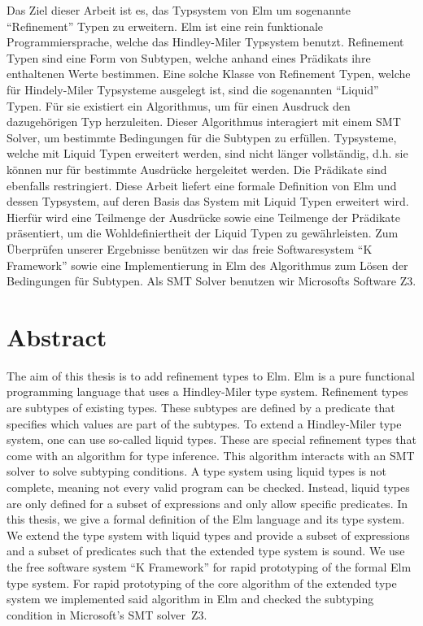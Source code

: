 \documentclass[]{scrbook}
\theoremstyle{definition}
\theoremstyle{definition}
\theoremstyle{definition}
\theoremstyle{remark}
\begin{document}
Das Ziel dieser Arbeit ist es, das Typsystem von Elm um sogenannte \enquote{Refinement} Typen zu erweitern. Elm ist eine rein funktionale Programmiersprache, welche das Hindley-Miler Typsystem benutzt. Refinement Typen sind eine Form von Subtypen, welche anhand eines Prädikats ihre enthaltenen Werte bestimmen. Eine solche Klasse von Refinement Typen, welche für Hindely-Miler Typsysteme ausgelegt ist, sind die sogenannten \enquote{Liquid} Typen. Für sie existiert ein Algorithmus, um für einen Ausdruck den dazugehörigen Typ herzuleiten. Dieser Algorithmus interagiert mit einem SMT Solver, um bestimmte Bedingungen für die Subtypen zu erfüllen. Typsysteme, welche mit Liquid Typen erweitert werden, sind nicht länger vollständig, d.h. sie können nur für bestimmte Ausdrücke hergeleitet werden. Die Prädikate sind ebenfalls restringiert.
Diese Arbeit liefert eine formale Definition von Elm und dessen Typsystem, auf deren Basis das System mit Liquid Typen erweitert wird. Hierfür wird eine Teilmenge der Ausdrücke sowie eine Teilmenge der Prädikate präsentiert, um die Wohldefiniertheit der Liquid Typen zu gewährleisten. Zum Überprüfen unserer Ergebnisse benützen wir das freie Softwaresystem \enquote{K Framework} sowie eine Implementierung in Elm des Algorithmus zum Lösen der Bedingungen für Subtypen. Als SMT Solver benutzen wir Microsofts Software Z3.
\newpage

\section*{Abstract}

The aim of this thesis is to add refinement types to Elm. Elm is a pure functional programming language that uses a Hindley-Miler type system. Refinement types are subtypes of existing types. These subtypes are defined by a predicate that specifies which values are part of the subtypes. To extend a Hindley-Miler type system, one can use so-called liquid types. These are special refinement types that come with an algorithm for type inference. This algorithm interacts with an SMT solver to solve subtyping conditions. A type system using liquid types is not complete, meaning not every valid program can be checked. Instead, liquid types are only defined for a subset of expressions and only allow specific predicates.
In this thesis, we give a formal definition of the Elm language and its type system. We extend the type system with liquid types and provide a subset of expressions and a subset of predicates such that the extended type system is sound. We use the free software system \enquote{K Framework} for rapid prototyping of the formal Elm type system. For rapid prototyping of the core algorithm of the extended type system we implemented said algorithm in Elm and checked the subtyping condition in Microsoft's SMT solver~Z3.
\end{document}
